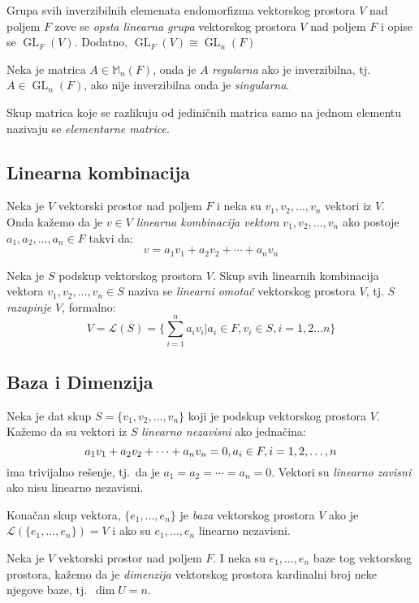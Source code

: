 \documentclass[12p,a4paper]{article}
\DeclareMathOperator{\GL}{GL}
\begin{document}
\begin{multicols}{2}
    Grupa svih inverzibilnih elemenata endomorfizma vektorskog prostora $V$ 
    nad poljem $F$ zove se \textit{opsta linearna grupa} vektorskog 
    prostora $V$ nad poljem $F$ i opise se $\GL_F(V)$. 
    Dodatno, $\GL_F(V) \cong \GL_n(F)$

    Neka je matrica $A \in \mathbb{M}_n (F)$, onda je $A$ \textit{regularna} 
    ako je inverzibilna, tj.\ $A \in \GL_n(F)$, ako nije inverzibilna onda 
    je \textit{singularna}.

    Skup matrica koje se razlikuju od jediničnih matrica samo na 
    jednom elementu nazivaju se \textit{elementarne matrice}.

\subsection{Linearna kombinacija}

    Neka je $V$ vektorski prostor nad poljem $F$ i neka su 
    $v_1, v_2, \ldots ,v_n$ vektori iz $V$. Onda kažemo da je $v \in V$ 
    \textit{linearna kombinacija vektora} $v_1, v_2, \ldots ,v_n$ ako postoje 
    $a_1, a_2, \ldots , a_n \in F$ takvi da:
    \[v = a_1 v_1 + a_2 v_2 + \cdots + a_n v_n\]

    Neka je $S$ podskup vektorskog prostora $V$. Skup svih linearnih 
    kombinacija vektora $v_1, v_2, \ldots ,v_n \in S$ naziva se 
    \textit{linearni omotač} vektorskog prostora $V$, tj. 
    $S$ \textit{razapinje} $V$, formalno:
    \[V = \mathcal{L} (S) = \{ \sum_{i=1}^n a_i v_i | 
    a_i \in F, v_i \in S, i = 1, 2 \ldots n \}\]

\subsection{Baza i Dimenzija}

    Neka je dat skup $S = \{ v_1, v_2, \ldots, v_n \}$ koji je podskup 
    vektorskog prostora $V$. Kažemo da su vektori iz $S$ 
    \textit{linearno nezavisni} ako jednačina:
    \[a_1 v_1 + a_2 v_2 + \cdots + a_n v_n = 0, 
    \\ a_i \in F, i = 1, 2, \ldots, n\]
    ima trivijalno rešenje, tj.\ da je $a_1 = a_2 = \cdots = a_n = 0$. 
    Vektori su \textit{linearno zavisni} ako nisu linearno nezavisni.

    Konačan skup vektora, $\{e_1, \ldots, e_n\}$ je \textit{baza} vektorskog 
    prostora $V$ ako je $\mathcal{L} (\{e_1, \ldots, e_n\}) = V$ i ako su 
    $e_1, \dots, e_n$ linearno nezavisni.

    Neka je $V$ vektorski prostor nad poljem $F$. I neka su $e_1, \ldots, e_n$ 
    baze tog vektorskog prostora, kažemo da je \textit{dimenzija} vektorskog 
    prostora kardinalni broj neke njegove baze, tj.\ $\dim U = n$.


\end{multicols}
\end{document}
